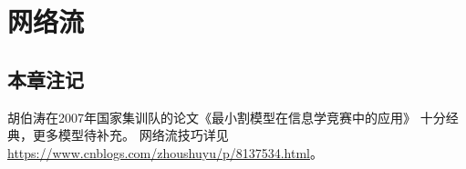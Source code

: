 \chapter{网络流}





\section{本章注记}
胡伯涛在2007年国家集训队的论文《最小割模型在信息学竞赛中的应用》\cite{MCIOI}
十分经典，更多模型待补充。
网络流技巧详见\url{https://www.cnblogs.com/zhoushuyu/p/8137534.html}。

